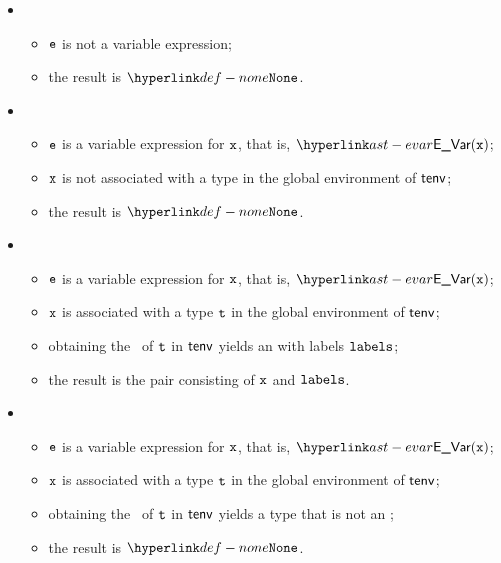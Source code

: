 \ProseParagraph
\OneApplies
\begin{itemize}
  \item {}
  \begin{itemize}
    \item $\ve$ is not a variable expression;
    \item the result is $\None$.
  \end{itemize}

  \item {}
  \begin{itemize}
    \item $\ve$ is a variable expression for $\vx$, that is, $\EVar(\vx)$;
    \item $\vx$ is not associated with a type in the global environment of $\tenv$;
    \item the result is $\None$.
  \end{itemize}

  \item {}
  \begin{itemize}
    \item $\ve$ is a variable expression for $\vx$, that is, $\EVar(\vx)$;
    \item $\vx$ is associated with a type $\vt$ in the global environment of $\tenv$;
    \item obtaining the \underlyingtype\ of $\vt$ in $\tenv$ yields an \enumerationtypeterm{} with labels $\vlabels$;
    \item the result is the pair consisting of $\vx$ and $\vlabels$.
  \end{itemize}

  \item {}
  \begin{itemize}
    \item $\ve$ is a variable expression for $\vx$, that is, $\EVar(\vx)$;
    \item $\vx$ is associated with a type $\vt$ in the global environment of $\tenv$;
    \item obtaining the \underlyingtype\ of $\vt$ in $\tenv$ yields a type that is not an \enumerationtypeterm{};
    \item the result is $\None$.
  \end{itemize}
\end{itemize}

\FormallyParagraph
\begin{mathpar}
\end{mathpar}

